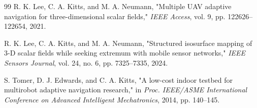 \documentclass[lettersize,journal]{IEEEtran}
\begin{document}
\begin{thebibliography}{99}
 R. K. Lee, C. A. Kitts, and M. A. Neumann, "Multiple UAV adaptive navigation for three-dimensional scalar fields," \textit{IEEE Access}, vol. 9, pp. 122626--122654, 2021.

 R. K. Lee, C. A. Kitts, and M. A. Neumann, "Structured isosurface mapping of 3-D scalar fields while seeking extremum with mobile sensor networks," \textit{IEEE Sensors Journal}, vol. 24, no. 6, pp. 7325--7335, 2024.

 S. Tomer, D. J. Edwards, and C. A. Kitts, "A low-cost indoor testbed for multirobot adaptive navigation research," in \textit{Proc. IEEE/ASME International Conference on Advanced Intelligent Mechatronics}, 2014, pp. 140--145.

\end{thebibliography}
\end{document}
